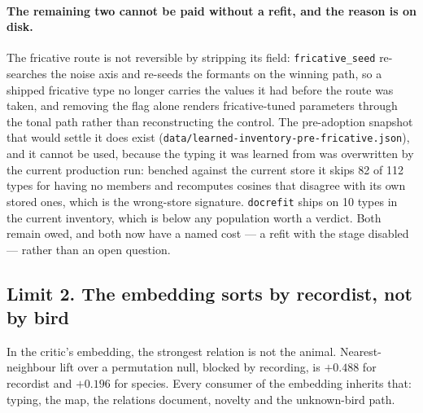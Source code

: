 \documentclass[10pt,twocolumn,a4paper]{article}
\begin{document}
\paragraph{The remaining two cannot be paid without a refit, and the reason is on disk.} The
fricative route is not reversible by stripping its field: \texttt{fricative\_seed} re-searches
the noise axis and re-seeds the formants on the winning path, so a shipped fricative type no
longer carries the values it had before the route was taken, and removing the flag alone renders
fricative-tuned parameters through the tonal path rather than reconstructing the control. The
pre-adoption snapshot that would settle it does exist
(\texttt{data/learned-\allowbreak inventory-\allowbreak pre-\allowbreak fricative.json}), and it
cannot be used, because the typing
it was learned from was overwritten by the current production run: benched against the current
store it skips 82 of 112 types for having no members and recomputes cosines that disagree with
its own stored ones, which is the wrong-store signature. \texttt{docrefit} ships on 10 types in
the current inventory, which is below any population worth a verdict. Both remain owed, and both
now have a named cost --- a refit with the stage disabled --- rather than an open question.

\subsection{Limit 2. The embedding sorts by recordist, not by bird}

In the critic's embedding, the strongest relation is not the animal. Nearest-neighbour lift
over a permutation null, blocked by recording, is $+0.488$ for recordist and $+0.196$ for
species.
Every consumer of the embedding inherits that: typing, the map, the relations document,
novelty and the unknown-bird path.
\end{document}
